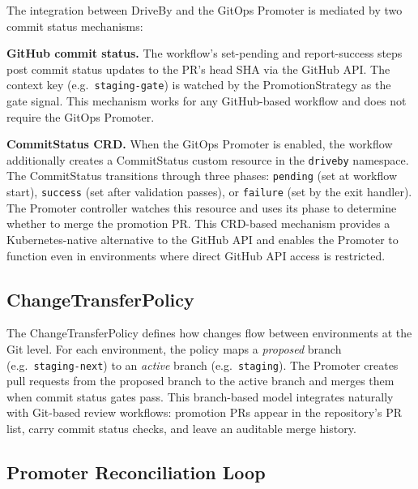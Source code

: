 The integration between DriveBy and the GitOps Promoter is mediated by two commit status mechanisms:

\textbf{GitHub commit status.} The workflow's set-pending and report-success steps post commit status updates to the PR's head SHA via the GitHub API. The context key (e.g.\ \texttt{staging-gate}) is watched by the PromotionStrategy as the gate signal. This mechanism works for any GitHub-based workflow and does not require the GitOps Promoter.

\textbf{CommitStatus CRD.} When the GitOps Promoter is enabled, the workflow additionally creates a CommitStatus custom resource in the \texttt{driveby} namespace. The CommitStatus transitions through three phases: \texttt{pending} (set at workflow start), \texttt{success} (set after validation passes), or \texttt{failure} (set by the exit handler). The Promoter controller watches this resource and uses its phase to determine whether to merge the promotion PR. This CRD-based mechanism provides a Kubernetes-native alternative to the GitHub API and enables the Promoter to function even in environments where direct GitHub API access is restricted.

\subsection{ChangeTransferPolicy}
\label{subsec:change-transfer-policy}

The ChangeTransferPolicy defines how changes flow between environments at the Git level. For each environment, the policy maps a \textit{proposed} branch (e.g.\ \texttt{staging-next}) to an \textit{active} branch (e.g.\ \texttt{staging}). The Promoter creates pull requests from the proposed branch to the active branch and merges them when commit status gates pass. This branch-based model integrates naturally with Git-based review workflows: promotion PRs appear in the repository's PR list, carry commit status checks, and leave an auditable merge history.

\subsection{Promoter Reconciliation Loop}
\label{subsec:promoter-reconciliation}

